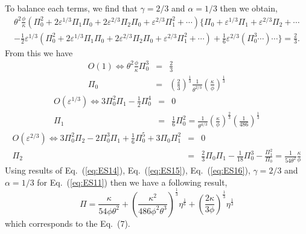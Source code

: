 \documentclass[aps,prl,superscriptaddress]{revtex4}  %
\begin{document}
To balance each terms, we find that $\gamma=2/3$ and $\alpha=1/3$ then we obtain, 
%
\begin{eqnarray}
\theta^2 \frac{\phi }{\kappa}\left( \Pi_0^2  + 2 \varepsilon^{1/3} \Pi_1 \Pi_0 +  2 \varepsilon^{2/3} \Pi_2 \Pi_0 + \varepsilon^{2/3} \Pi_1^2 + \cdots  \right) \{\Pi_0 + \varepsilon^{1/3} \Pi_1 + \varepsilon^{2/3} \Pi_2 + \cdots \nonumber  \\  
- \frac{1}{2}\varepsilon^{1/3} \left(\Pi_0^2  + 2 \varepsilon^{1/3} \Pi_1 \Pi_0 +  2 \varepsilon^{2/3} \Pi_2 \Pi_0 + \varepsilon^{2/3} \Pi_1^2 + \cdots \right) + \frac{1}{6}\varepsilon^{2/3} \left(\Pi_0^3 \cdots \right)\cdots \} = \frac{2}{3}.   \label{eq:ES13}
\end{eqnarray}
%
From this we have
%
\begin{eqnarray}
O\left(1 \right) \Leftrightarrow \theta^2 \frac{\phi }{\kappa} \Pi_0^3 &=& \frac{2}{3} \nonumber \\ 
\Pi_0 &=& \left( \frac{2}{3} \right)^{\frac{1}{3}} \frac{1 }{\theta^{2/3}} \left( \frac{\kappa }{\phi}\right)^{\frac{1}{3}} 
\label{eq:ES14}
\end{eqnarray}
%
\begin{eqnarray}
O\left(\varepsilon^{1/3} \right) \Leftrightarrow 3\Pi_0^2 \Pi_1 - \frac{1}{2}\Pi_0^4 &=& 0 \nonumber \\
\Pi_1 &=& \frac{1}{6} \Pi_0^2 = \frac{1}{ \theta^{4/3}} \left( \frac{\kappa }{\phi} \right)^{\frac{2}{3}} \left(\frac{1}{486} \right)^{\frac{1}{3}}
\label{eq:ES15}
\end{eqnarray}
%
\begin{eqnarray}
O\left(\varepsilon^{2/3} \right) \Leftrightarrow 3\Pi_0^2 \Pi_2 - 2 \Pi_0^3\Pi_1 +\frac{1}{6} \Pi_0^5 +3 \Pi_0\Pi_1^2 &=& 0 \nonumber \\
\Pi_2 &=& \frac{2}{3} \Pi_0 \Pi_1   -\frac{1}{18} \Pi_0^3   - \frac{\Pi_1^2}{\Pi_0}= \frac{1}{54 \theta^2}  \frac{\kappa }{\phi}
\label{eq:ES16}
\end{eqnarray}
%
Using results of Eq.~(\ref{eq:ES14}), Eq.~(\ref{eq:ES15}), Eq.~(\ref{eq:ES16}), $\gamma = 2/3$ and $\alpha = 1/3$ for Eq.~(\ref{eq:ES11}) then we have a following result,
\begin{equation}
\Pi = \frac{ \kappa}{54 \phi \theta^2 } + \left(\frac{\kappa^2 }{486 \phi^2 \theta^{3} }\right)^{\frac{1}{3}} \eta^{\frac{1}{6}} + \left( \frac{2 \kappa}{3 \phi} \right)^{\frac{1}{3}}\eta^{\frac{1}{3}}
\label{eq:ES17}
\end{equation}
which corresponds to the Eq.~(7).
\end{document}
